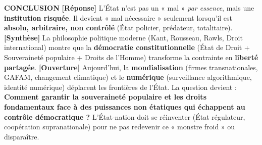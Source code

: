 \documentclass[11pt]{article}
\begin{document}
\begin{exoresolu}
\textbf{CONCLUSION}
\textbf{[Réponse]} L'État n'est pas un « mal » \emph{par essence}, mais une \textbf{institution risquée}. Il devient « mal nécessaire » seulement lorsqu'il est \textbf{absolu, arbitraire, non contrôlé} (État policier, prédateur, totalitaire).
\textbf{[Synthèse]} La philosophie politique moderne (Kant, Rousseau, Rawls, Droit international) montre que la \textbf{démocratie constitutionnelle} (État de Droit + Souveraineté populaire + Droits de l'Homme) transforme la contrainte en \textbf{liberté partagée}.
\textbf{[Ouverture]} Aujourd'hui, la \textbf{mondialisation} (firmes transnationales, GAFAM, changement climatique) et le \textbf{numérique} (surveillance algorithmique, identité numérique) déplacent les frontières de l'État. La question devient : \textbf{Comment garantir la souveraineté populaire et les droits fondamentaux face à des puissances non étatiques qui échappent au contrôle démocratique ?} L'État-nation doit se réinventer (État régulateur, coopération supranationale) pour ne pas redevenir ce « monstre froid » ou disparaître.
\end{exoresolu}
\end{document}
